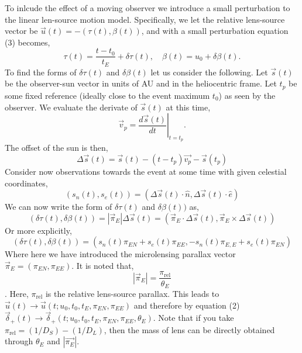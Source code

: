 \documentclass[11pt]{article}
\begin{document}
To inlcude the effect of a moving observer we introduce a small perturbation to the linear
len-source motion model. Specifically, we let the relative lens-source vector be 
$\vec{u}(t) = -(\tau(t),\beta(t))$, and with a small perturbation equation (3) becomes,
%
\begin{equation}
\tau(t) = \frac{t-t_{0}}{t_{E}}+\delta\tau(t), \quad \beta(t) =  u_{0}+\delta\beta(t).
\end{equation}
%
To find the forms of $\delta\tau(t)$ and $\delta\beta(t)$ let us consider the following.
Let $\vec{s}(t)$ be the observer-sun vector in units of AU and in the heliocentric frame. 
Let $t_{p}$ be some fixed reference (ideally close to the event maximum $t_{0}$) as seen 
by the observer. We evaluate the derivate of $\vec{s}(t)$ at this time,
%
\begin{equation}
\vec{v}_{p} =\left. \frac{d\vec{s}(t)}{dt}\right|_{t=t_{p}}.
\end{equation}
%
The offset of the sun is then,
%
\begin{equation}
\Delta\vec{s}(t) = \vec{s}(t)-(t-t_{p})\vec{v_{p}}-\vec{s}(t_{p})
\end{equation}
%
Consider now observations towards the event at some time with given
celestial coordinates,
%
\begin{equation}
(s_{n}(t),s_{e}(t)) = (\Delta\vec{s}(t)\cdot\hat{n},\Delta\vec{s}(t)\cdot\hat{e})
\end{equation}
%
We can now write the form of $\delta\tau(t)$ and $\delta\beta(t))$ as,
%
\begin{equation}
(\delta\tau(t),\delta\beta(t)) = |\vec{\pi}_{E}|\Delta\vec{s}(t) = 
(\vec{\pi}_{E}\cdot\Delta\vec{s}(t),\vec{\pi}_{E}\times\Delta\vec{s}(t))
\end{equation}
%
Or more explicitly,
%
\begin{equation}
(\delta\tau(t),\delta\beta(t)) =  (s_{n}(t)\pi_{EN}+s_{e}(t)\pi_{EE},
                                  -s_{n}(t)\pi_{E,E}+s_{e}(t)\pi_{EN})
\end{equation}
%
Where here we have introduced the microlensing parallax vector 
$\vec{\pi}_{E} = (\pi_{EN},\pi_{EE})$. It is noted that,
%
\begin{equation}
|\vec{\pi}_{E}| = \frac{\pi_{\text{rel}}}{\theta_{E}}
\end{equation}.
%
Here, $\pi_{\text{rel}}$ is the relative lens-source parallax.
This leads to $\vec{u}(t) \to \vec{u}(t;u_{0},t_{0},t_{E},\pi_{EN},\pi_{EE})$ and therefore
by equation (2) 
$\vec{\delta}_{+}(t) \to \vec{\delta}_{+}(t;u_{0},t_{0},t_{E},\pi_{EN},\pi_{EE},\theta_{E})$.
Note that if you take $\pi_{\text{rel}}=(1/D_{S})-(1/D_{L})$, then the mass of lens can be directly
obtained through $\theta_{E}$ and $|\vec{\pi_{E}}|$.
\end{document}
